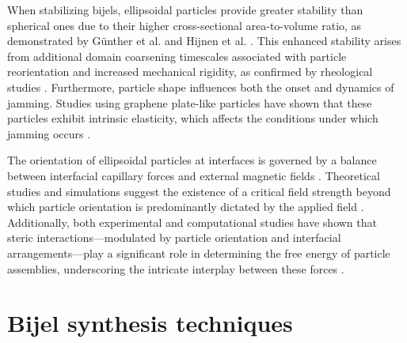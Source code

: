 When stabilizing bijels, ellipsoidal particles provide greater stability than spherical ones due to their higher cross-sectional area-to-volume ratio, as demonstrated by 
Günther et al. and Hijnen et al. \cite{gunther_timescales_2014, hijnen_bijels_2015}. This enhanced stability arises from additional domain coarsening timescales associated 
with particle reorientation and increased mechanical rigidity, as confirmed by rheological studies \cite{gunther_timescales_2014, daware_emulsions_2015, witt_bijel_2013}. 
Furthermore, particle shape influences both the onset and dynamics of jamming. Studies using graphene plate-like particles have shown that these particles exhibit intrinsic 
elasticity, which affects the conditions under which jamming occurs \cite{imperiali_simple_2014, sun_assembly_2013}.

The orientation of ellipsoidal particles at interfaces is governed by a balance between interfacial capillary forces and external magnetic fields 
\cite{bresme_orientational_2007, davies_assembling_2014}. Theoretical studies and simulations suggest the existence of a critical field strength beyond which particle 
orientation is predominantly dictated by the applied field \cite{bresme_orientational_2007, davies_assembling_2014}. Additionally, both experimental and computational 
studies have shown that steric interactions—modulated by particle orientation and interfacial arrangements—play a significant role in determining the free energy of particle 
assemblies, underscoring the intricate interplay between these forces \cite{morgan_understanding_2013, newton_influence_2014, newton_capillary_2018}.


\section{Bijel synthesis techniques}

